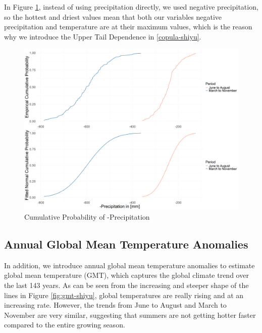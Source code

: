 \documentclass[
]{krantz}
\begin{document}
In Figure \ref{fig:PrecipitationCPD-shiyu}, instead of using precipitation directly, we used negative precipitation, so the hottest and driest values mean that both our variables negative precipitation and temperature are at their maximum values, which is the reason why we introduce the Upper Tail Dependence in \ref{copula-shiyu}.

\begin{figure}

{\centering \includegraphics[width=0.65\linewidth]{work/03-compounds/figures/Precipitation/Average/PrecipitationCPD} 

}

\caption{Cumulative Probability of -Precipitation}\label{fig:PrecipitationCPD-shiyu}
\end{figure}

\subsection{Annual Global Mean Temperature Anomalies}\label{anomalies-shiyu}

In addition, we introduce annual global mean temperature anomalies to estimate global mean temperature (GMT), which captures the global climate trend over the last 143 years. As can be seen from the increasing and steeper shape of the lines in Figure \ref{fig:gmt-shiyu}, global temperatures are really rising and at an increasing rate. However, the trends from June to August and March to November are very similar, suggesting that summers are not getting hotter faster compared to the entire growing season.
\end{document}
